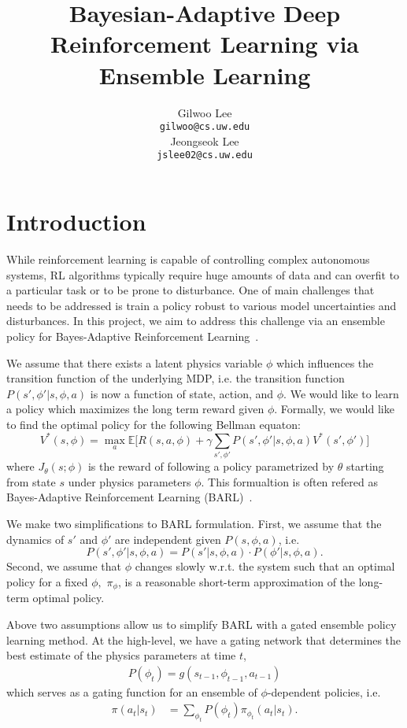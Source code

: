 \documentclass{article}
\title{Bayesian-Adaptive Deep Reinforcement Learning via Ensemble Learning}
\author{Gilwoo Lee \\
  \texttt{gilwoo@cs.uw.edu} \\
  \And
  Jeongseok Lee \\
  \texttt{jslee02@cs.uw.edu}
}
\begin{document}

\maketitle

\section{Introduction}
While reinforcement learning is capable of controlling complex autonomous systems, RL algorithms typically require huge amounts of data and can overfit to a particular task or to be prone to disturbance. One of main challenges that needs to be addressed is train a policy robust to various model uncertainties and disturbances. In this project, we aim to address this challenge via an ensemble policy for Bayes-Adaptive Reinforcement Learning~\cite{ghavamzadeh2015bayesian}.

We assume that there exists a latent physics variable $\phi$ which influences the transition function of the underlying MDP, i.e. the transition function  $P(s',\phi' |s, \phi, a)$ is now a function of state, action, and $\phi$. We would like to learn a policy which maximizes the long term reward given $\phi$. Formally, we would like to find the optimal policy for the following Bellman equaton:
\begin{equation}\label{eq:rl}
V^*(s, \phi) = \max_a \mathbb{E} \bigg[R(s, a, \phi) + \gamma \sum_{s', \phi'}P(s',\phi'|s, \phi, a)V^*(s', \phi') \bigg]
\end{equation}
where $J_\theta(s; \phi)$ is the reward of following a policy parametrized by $\theta$ starting from state $s$ under physics parameters $\phi$. This formualtion is often refered as Bayes-Adaptive Reinforcement Learning (BARL)~\cite{ghavamzadeh2015bayesian}.

We make two simplifications to BARL formulation. First, we assume that the dynamics of $s'$ and $\phi'$ are independent given $P(s, \phi, a)$, i.e.
\begin{equation*}
P(s',\phi'|s, \phi, a) = P(s'|s, \phi, a)\cdot P(\phi'|s, \phi, a).
\end{equation*}
Second, we assume that $\phi$ changes slowly w.r.t. the system such that an optimal policy for a fixed $\phi,$
$\pi_{\phi}$, is a reasonable short-term approximation of the long-term optimal policy.

Above two assumptions allow us to simplify BARL with a gated ensemble policy learning method. At the high-level, we have a gating network that determines the best estimate of the physics parameters at time $t$,
\begin{align*}
P(\phi_t) = g(s_{t-1}, \phi_{t-1}, a_{t-1})
\end{align*}
which serves as a gating function for an ensemble of $\phi$-dependent policies, i.e.
\begin{align*}
\pi(a_t | s_t) &= \sum_{\phi_t} P(\phi_t) \pi_{\phi_t}(a_t | s_t).
\end{align*}
\end{document}
